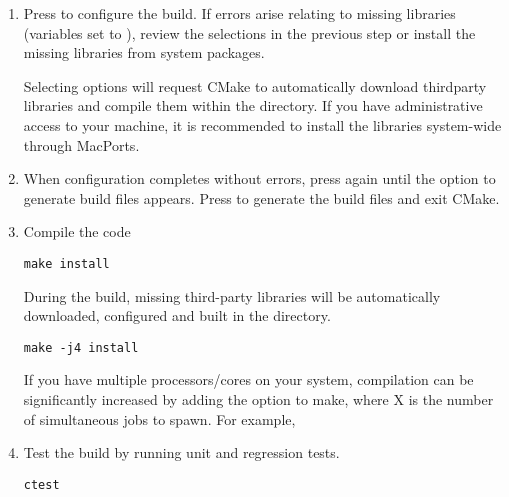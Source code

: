 \begin{enumerate}
    \item Press  to configure the build. If errors arise relating to
        missing libraries (variables set to ), review the  selections in the previous
    step or install the missing libraries from system packages. 
    
    \begin{notebox}
    Selecting  options will request CMake to
    automatically download thirdparty libraries and compile them within the
    \nekpp directory. If you have administrative access to your machine, it is
    recommended to install the libraries system-wide through MacPorts.
    \end{notebox}
    
    \item When configuration completes without errors, press  again
    until the option  to generate build files appears. Press 
    to generate the build files and exit CMake.
    
    \item Compile the code
    \begin{lstlisting}[style=BashInputStyle]
        make install
    \end{lstlisting}
    During the build, missing third-party libraries will be automatically
    downloaded, configured and built in the \nekpp {} directory.
    
    \newsavebox\installationMacTip
    \begin{lrbox}{\installationMacTip}\begin{minipage}{0.8\linewidth}
    \begin{lstlisting}[style=BashInputStyle]
    make -j4 install
    \end{lstlisting}
    \end{minipage}
    \end{lrbox}
    
    \begin{tipbox}
    If you have multiple processors/cores on your system, compilation can be
    significantly increased by adding the  option to make, where X is
    the number of simultaneous jobs to spawn. For example,
    \noindent\usebox\installationMacTip
    \end{tipbox}
    
    \item Test the build by running unit and regression tests.
    \begin{lstlisting}[style=BashInputStyle]
    ctest
    \end{lstlisting}
\end{enumerate}



